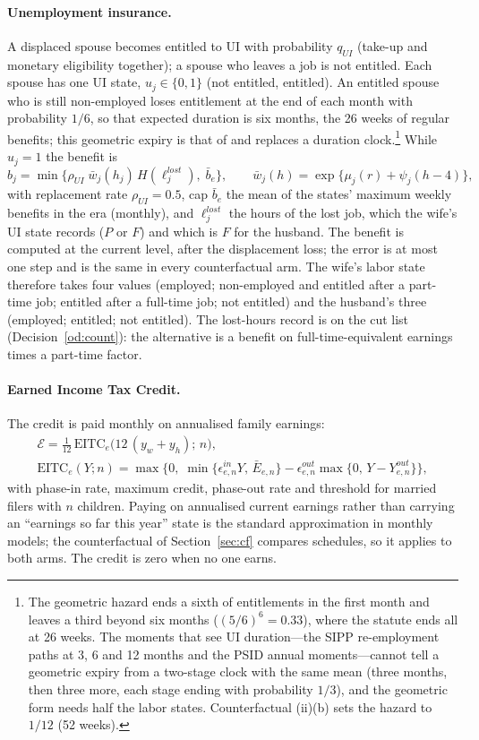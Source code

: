 \documentclass[11pt]{article}
\newcommand{\1}{\mathbf{1}}
\begin{document}
\paragraph{Unemployment insurance.} A displaced spouse becomes entitled to UI with probability $q_{UI}$ (take-up and
monetary eligibility together); a spouse who leaves a job is not entitled. Each spouse has one UI state, $u_j \in
\{0, 1\}$ (not entitled, entitled). An entitled spouse who is still non-employed loses entitlement at the end of each
month with probability $1/6$, so that expected duration is six months, the 26 weeks of regular benefits; this
geometric expiry is that of \citet{bacher2025joint} and replaces a duration clock.\footnote{The geometric hazard ends
a sixth of entitlements in the first month and leaves a third beyond six months ($(5/6)^6 = 0.33$), where the statute
ends all at 26 weeks. The moments that see UI duration---the SIPP re-employment paths at 3, 6 and 12 months and the
PSID annual moments---cannot tell a geometric expiry from a two-stage clock with the same mean (three months, then
three more, each stage ending with probability $1/3$), and the geometric form needs half the labor states. Counterfactual (ii)(b) sets the hazard to $1/12$ (52 weeks).} While $u_j = 1$ the benefit is
\[
  b_j = \min\big\{\rho_{UI}\; \bar w_j(h_j)\, H(\ell_j^{lost}),\; \bar b_{e}\big\},
  \qquad \bar w_j(h) = \exp\{\mu_j(r) + \psi_j(h - 4)\},
\]
with replacement rate $\rho_{UI} = 0.5$, cap $\bar b_e$ the mean of the states' maximum weekly benefits in the era
(monthly), and $\ell_j^{lost}$ the hours of the lost job, which the wife's UI state records ($P$ or $F$) and which is
$F$ for the husband. The benefit is computed at the current level, after the displacement loss; the error is at most
one step and is the same in every counterfactual arm. The wife's labor state therefore takes four values (employed;
non-employed and entitled after a part-time job; entitled after a full-time job; not entitled) and the husband's three
(employed; entitled; not entitled). The lost-hours record is on the cut list (Decision~\ref{od:count}): the alternative is
a benefit on full-time-equivalent earnings times a part-time factor.

\paragraph{Earned Income Tax Credit.} The credit is paid monthly on annualised family earnings:
\begin{gather*}
  \mathcal E = \tfrac{1}{12}\,\mathrm{EITC}_e\big(12\,(y_w + y_h);\, n\big), \\
  \mathrm{EITC}_e(Y; n) = \max\Big\{0,\; \min\{\epsilon^{in}_{e,n} Y,\, \bar E_{e,n}\} - \epsilon^{out}_{e,n}\max\{0,\, Y - Y^{out}_{e,n}\}\Big\},
\end{gather*}
with phase-in rate, maximum credit, phase-out rate and threshold for married filers with $n$ children. Paying on
annualised current earnings rather than carrying an ``earnings so far this year'' state is the standard approximation
in monthly models; the counterfactual of Section~\ref{sec:cf} compares schedules, so it applies to both arms. The
credit is zero when no one earns.
\end{document}
